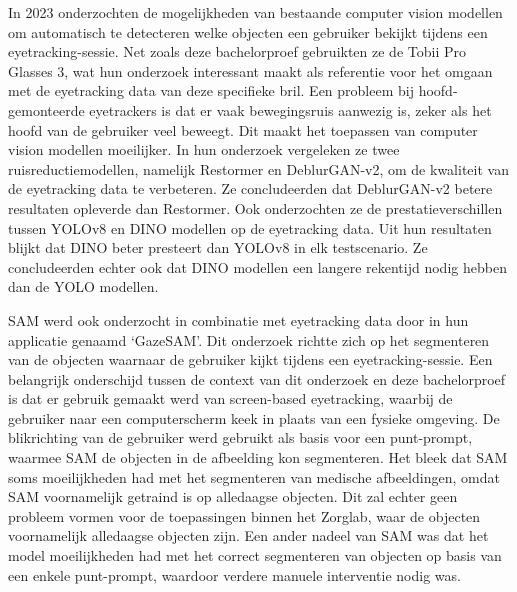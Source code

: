In 2023 onderzochten \textcite{CederinBremberg2023} de mogelijkheden van bestaande computer vision modellen om automatisch te detecteren welke objecten een gebruiker bekijkt tijdens een eyetracking-sessie.
Net zoals deze bachelorproef gebruikten ze de Tobii Pro Glasses 3, wat hun onderzoek interessant maakt als referentie voor het omgaan met de eyetracking data van deze specifieke bril.
Een probleem bij hoofd-gemonteerde eyetrackers is dat er vaak bewegingsruis aanwezig is, zeker als het hoofd van de gebruiker veel beweegt. Dit maakt het toepassen van computer vision modellen moeilijker.
In hun onderzoek vergeleken ze twee ruisreductiemodellen, namelijk Restormer en DeblurGAN-v2, om de kwaliteit van de eyetracking data te verbeteren. Ze concludeerden dat DeblurGAN-v2 betere resultaten opleverde dan Restormer.
Ook onderzochten ze de prestatieverschillen tussen YOLOv8 en DINO modellen op de eyetracking data. Uit hun resultaten blijkt dat DINO beter presteert dan YOLOv8 in elk testscenario. Ze concludeerden echter ook dat 
DINO modellen een langere rekentijd nodig hebben dan de YOLO modellen.

SAM werd ook onderzocht in combinatie met eyetracking data door \textcite{Wang2023} in hun applicatie genaamd `GazeSAM'. Dit onderzoek richtte zich op het segmenteren van de objecten waarnaar de gebruiker kijkt tijdens een eyetracking-sessie.
Een belangrijk onderschijd tussen de context van dit onderzoek en deze bachelorproef is dat er gebruik gemaakt werd van screen-based eyetracking, waarbij de gebruiker naar een computerscherm keek in plaats van een fysieke omgeving.
De blikrichting van de gebruiker werd gebruikt als basis voor een punt-prompt, waarmee SAM de objecten in de afbeelding kon segmenteren. Het bleek dat SAM soms moeilijkheden had met het segmenteren van medische afbeeldingen, omdat 
SAM voornamelijk getraind is op alledaagse objecten. Dit zal echter geen probleem vormen voor de toepassingen binnen het Zorglab, waar de objecten voornamelijk alledaagse objecten zijn. Een ander nadeel van SAM was dat het model 
moeilijkheden had met het correct segmenteren van objecten op basis van een enkele punt-prompt, waardoor verdere manuele interventie nodig was.